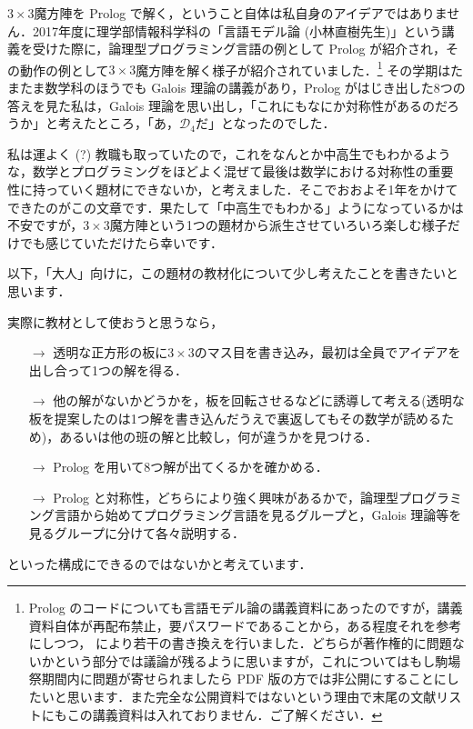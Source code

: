 \documentclass[11pt]{jsarticle}
\begin{document}
$3\times 3$魔方陣を Prolog で解く，ということ自体は私自身のアイデアではありません．2017年度に理学部情報科学科の「言語モデル論 (小林直樹先生)」という講義を受けた際に，論理型プログラミング言語の例として Prolog が紹介され，その動作の例として$3\times 3$魔方陣を解く様子が紹介されていました．\footnote{Prolog のコードについても言語モデル論の講義資料にあったのですが，講義資料自体が再配布禁止，要パスワードであることから，ある程度それを参考にしつつ，\cite[p. 133--4]{iitaka} により若干の書き換えを行いました．どちらが著作権的に問題ないかという部分では議論が残るように思いますが，これについてはもし駒場祭期間内に問題が寄せられましたら PDF 版の方では非公開にすることにしたいと思います．また完全な公開資料ではないという理由で末尾の文献リストにもこの講義資料は入れておりません．ご了解ください．}
その学期はたまたま数学科のほうでも Galois 理論の講義があり，Prolog がはじき出した8つの答えを見た私は，Galois 理論を思い出し，「これにもなにか対称性があるのだろうか」と考えたところ，「あ，$\mathcal{D}_4$だ」となったのでした．

私は運よく (?) 教職も取っていたので，これをなんとか中高生でもわかるような，数学とプログラミングをほどよく混ぜて最後は数学における対称性の重要性に持っていく題材にできないか，と考えました．そこでおおよそ1年をかけてできたのがこの文章です．果たして「中高生でもわかる」ようになっているかは不安ですが，$3\times 3$魔方陣という1つの題材から派生させていろいろ楽しむ様子だけでも感じていただけたら幸いです．

以下，「大人」向けに，この題材の教材化について少し考えたことを書きたいと思います．

実際に教材として使おうと思うなら，
\begin{itemize}
\item[$\rightarrow$] 透明な正方形の板に$3\times 3$のマス目を書き込み，最初は全員でアイデアを出し合って1つの解を得る．

\item[$\rightarrow$] 他の解がないかどうかを，板を回転させるなどに誘導して考える(透明な板を提案したのは1つ解を書き込んだうえで裏返してもその数学が読めるため)，あるいは他の班の解と比較し，何が違うかを見つける．

\item[$\rightarrow$] Prolog を用いて8つ解が出てくるかを確かめる．

\item[$\rightarrow$] Prolog と対称性，どちらにより強く興味があるかで，論理型プログラミング言語から始めてプログラミング言語を見るグループと，Galois 理論等を見るグループに分けて各々説明する．
\end{itemize}
といった構成にできるのではないかと考えています．
\end{document}

